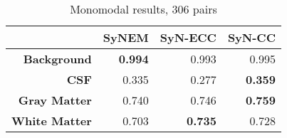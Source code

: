 \begin{table}[htbp]
  \centering
    \begin{tabular}{rrrr}
    \toprule
    \textbf{} & \textbf{SyNEM} & \textbf{SyN-ECC} & \textbf{SyN-CC} \\
    \midrule
    \textbf{Background} & \textbf{0.994} & 0.993 & 0.995 \\
    \textbf{CSF} & 0.335 & 0.277 & \textbf{0.359} \\
    \textbf{Gray Matter} & 0.740 & 0.746 & \textbf{0.759} \\
    \textbf{White Matter} & 0.703 & \textbf{0.735} & 0.728 \\
    \bottomrule
    \end{tabular}%
    \caption{Monomodal results, 306 pairs}
  \label{tab:addlabel}%
\end{table}%

